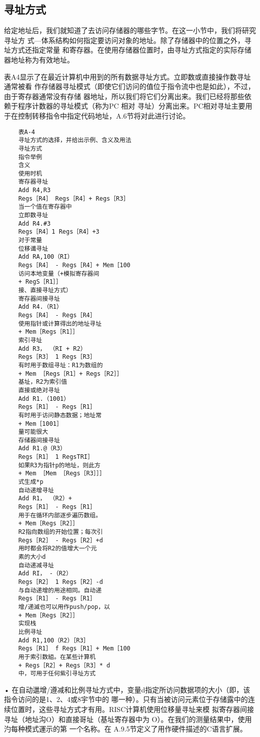 \subsection{寻址方式}
给定地址后，我们就知道了去访问存储器的哪些字节。在这一小节中，我们将研究寻址方
式—体系结构如何指定要访问对象的地址。除了存储器中的位置之外，寻址方式还指定常量
和寄存器。在使用存储器位置时，由寻址方式指定的实际存储器地址称为有效地址。

表A4显示了在最近计算机中用到的所有数据寻址方式。立即数或直接操作数寻址通常被看
作存储器寻址模式（即使它们访问的值位于指令流中也是如此），不过，由于寄存器通常没有存储
器地址，所以我们将它们分离出来。我们已经将那些依赖于程序计数器的寻址模式（称为PC 相对
寻址）分离出来。PC相对寻址主要用于在控制转移指令中指定代码地址，A.6节将对此进行讨论。
\begin{verbatim}
    表A-4
    寻址方式的选择，并给出示例、含义及用法
    寻址方式
    指令举例
    含义
    使用时机
    寄存器寻址
    Add R4,R3
    Regs［R4］ Regs［R4］+ Regs［R3］
    当一个值在寄存器中
    立即数寻址
    Add R4.#3
    Regs［R4］1 Regs［R4］+3
    对于常量
    位移谶寻址
    Add RA,100（RI）
    Regs［R4］ - Regs［R4］+ Mem［100
    访问本地变量（+模拟寄存器间
    + RegS［R1］］
    接、直接寻址方式）
    寄存器间接寻址
    Add R4.（R1）
    Regs［R4］ - Regs［R4］
    使用指针或计算得出的地址寻址
    + Mem［Regs［R1］］
    索引寻址
    Add R3， （RI + R2）
    Regs［R3］ 1 Regs［R3］
    有时用于数组寻址：R1为数组的
    + Mem ［Regs［R1］+ Regs［R2］］
    基址，R2为索引值
    直接或绝对寻址
    Add R1.（1001）
    Regs［R1］ - Regs［R1］
    有时用于访问静态数据；地址常
    + Mem［1001］
    量可能很大
    存储器间接寻址
    Add R1.@（R3）
    Regs［R1］ 1 RegsTRI］
    如果R3为指针p的地址，则此方
    + Mem ［Mem ［Regs［R3］］］
    式生成*p
    自动递增寻址
    Add R1， （R2）+
    Regs［R1］ - Regs［R1］
    用于在循环内部逐步遍历数组。
    + Mem［Regs［R2］］
    R2指向数组的开始位置；每次引
    Regs［R2］ - Regs［R2］+d
    用时都会将R2的值增大一个元
    素的大小d
    自动递减寻址
    Add RI， -（R2）
    Regs［R2］ 1 Regs［R2］-d
    与自动递增的用途相同。自动递
    Regs［R1］ - Regs［R1］
    增/递滅也可以用作push/pop，以
    + Mem［Regs［R2］］
    实现栈
    比例寻址
    Add R1,100（R2）［R3］
    Regs［R1］ f Regs［R1］+ Mem［100
    用于索引数組。在某些计算机
    + Regs［R2］+ Regs［R3］* d
    中，可用于任何紫引寻址方式
\end{verbatim}
• 在自动邋增/遵减和比例寻址方式中，变量d指定所访问数据项的大小（即，该指令访问的是1、2、4或8宇节中的
哪一种）。只有当被访问元素位于存储露中的连续位置时，这些寻址方式才有用。RISC计算机使用位移量寻址来模
拟寄存器间接寻址（地址沟O）和直接哥址（基址寄存器中为 O）。在我们的测量结果中，使用汋每种模式運示的第
一个名称。在 A.9.5节定义了用作硬件描述的C语言扩展。

